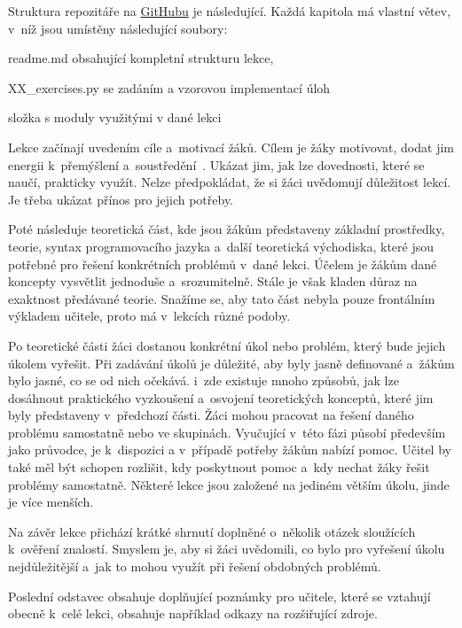 \documentclass[
  digital,     %
  oneside,     %
  nosansbold,  %
  colorbold, %
  lof,         %
  nolot,         %
]{fithesis4}
\begin{document}
Struktura repozitáře na \href{https://github.com/denisa-mat/BP-microbit}{GitHubu} je následující. Každá kapitola má vlastní větev, v~níž jsou umístěny následující soubory:
\vspace{0,1cm}
\begin{compactitem}
    \item readme.md obsahující kompletní strukturu lekce,
    \item XX\_exercises.py se zadáním a vzorovou implementací úloh
    \item složka s moduly využitými v dané lekci
\end{compactitem}

Lekce začínají uvedením cíle a~motivací žáků. Cílem je žáky motivovat, dodat jim energii k~přemýšlení a~soustředění~\cite{Filgona20}. Ukázat jim, jak lze dovednosti, které se naučí, prakticky využít. Nelze předpokládat, že si žáci uvědomují důležitost lekcí. Je třeba ukázat přínos pro jejich potřeby.

Poté následuje teoretická část, kde jsou žákům představeny základní prostředky, teorie, syntax programovacího jazyka a~další teoretická východiska, které jsou potřebné pro řešení konkrétních problémů v~dané lekci. Účelem je žákům dané koncepty vysvětlit jednoduše a~srozumitelně. Stále je však kladen důraz na exaktnost předávané teorie. Snažíme se, aby tato část nebyla pouze frontálním výkladem učitele, proto má v~lekcích různé podoby. 

Po teoretické části žáci dostanou konkrétní úkol nebo problém, který bude jejich úkolem vyřešit. Při zadávání úkolů je důležité, aby byly jasně definované a~žákům bylo jasné, co se od nich očekává.  i~zde existuje mnoho způsobů, jak lze dosáhnout praktického vyzkoušení a~osvojení teoretických konceptů, které jim byly představeny v~předchozí části. Žáci mohou pracovat na řešení daného problému samostatně nebo ve skupinách. Vyučující v~této fázi působí především jako průvodce, je k~dispozici a v~případě potřeby žákům nabízí pomoc. Učitel by také měl být schopen rozlišit, kdy poskytnout pomoc a~kdy nechat žáky řešit problémy samostatně. Některé lekce jsou založené na jediném větším úkolu, jinde je více menších.

Na závěr lekce přichází krátké shrnutí doplněné o~několik otázek sloužících k~ověření znalostí. Smyslem je, aby si žáci uvědomili, co bylo pro vyřešení úkolu nejdůležitější a~jak to mohou využít při řešení obdobných problémů.

Poslední odstavec obsahuje doplňující poznámky pro učitele, které se vztahují obecně k~celé lekci, obsahuje například odkazy na rozšiřující zdroje.  %
\end{document}
